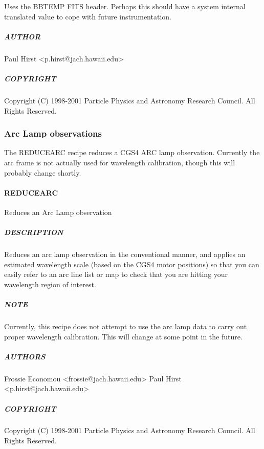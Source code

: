 \documentclass[twoside,11pt]{article}
\renewcommand{\_}{\texttt{\symbol{95}}}
\begin{document}
Uses the BBTEMP FITS header. Perhaps this should have a system internal
translated value to cope with future instrumentation.

\subparagraph*{AUTHOR\label{_NORMALISE_FLAT_BY_BB__AUTHOR}}

Paul Hirst <p.hirst@jach.hawaii.edu>

\subparagraph*{COPYRIGHT\label{_NORMALISE_FLAT_BY_BB__COPYRIGHT}}

Copyright (C) 1998-2001 Particle Physics and Astronomy Research
Council. All Rights Reserved.


\subsubsection{Arc Lamp observations}

The REDUCE\_ARC recipe reduces a CGS4 ARC lamp observation. Currently
the arc frame is not actually used for wavelength calibration, though
this will probably change shortly.

\paragraph*{REDUCE\_ARC\label{REDUCE_ARC}}

Reduces an Arc Lamp observation

\subparagraph*{DESCRIPTION\label{REDUCE_ARC_DESCRIPTION}}

Reduces an arc lamp observation in the conventional manner, and
applies an estimated wavelength scale (based on the CGS4 motor
positions) so that you can easily refer to an arc line list or map to
check that you are hitting your wavelength region of interest.

\subparagraph*{NOTE\label{REDUCE_ARC_NOTE}}

Currently, this recipe does not attempt to use the arc lamp data to
carry out proper wavelength calibration. This will change at some
point in the future.

\subparagraph*{AUTHORS\label{REDUCE_ARC_AUTHORS}}

Frossie Economou <frossie@jach.hawaii.edu>
Paul Hirst <p.hirst@jach.hawaii.edu>

\subparagraph*{COPYRIGHT\label{REDUCE_ARC_COPYRIGHT}}

Copyright (C) 1998-2001 Particle Physics and Astronomy Research
Council. All Rights Reserved.
\end{document}
